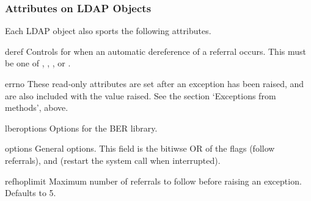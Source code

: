 
\subsubsection{Attributes on LDAP Objects}

Each LDAP object also sports the following attributes.


\begin{datadesc}{deref}
    Controls for when an automatic dereference of a referral occurs.
    This must be one of
    , , ,
    or .
\end{datadesc}


\begin{datadesc}{errno}
    These read-only attributes are set after an exception has been raised, and
    are also included with the value raised. See the section
    `Exceptions from methods', above.
\end{datadesc}


\begin{datadesc}{lberoptions}
    Options for the BER library.
\end{datadesc}


\begin{datadesc}{options}
    General options. This field is the bitiwse OR of the flags
	 (follow referrals), and
	   (restart the  system call
			      when interrupted).
\end{datadesc}


\begin{datadesc}{refhoplimit}
    Maximum number of referrals to follow before raising an exception.
    Defaults to 5.
\end{datadesc}


